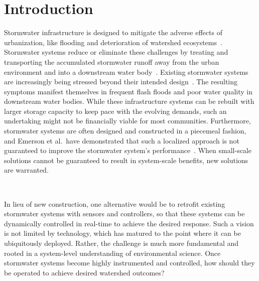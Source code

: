 \chapter{Introduction}\label{ch:introduction}
Stormwater infrastructure is designed to mitigate the adverse effects of urbanization, like flooding and deterioration of watershed ecosystems~\cite{national2009urban, randhir2009urbanization}.
Stormwater systems reduce or eliminate these challenges by treating and transporting the accumulated stormwater runoff away from the urban environment and into a downstream water body~\cite{national2009urban}.
Existing stormwater systems are increasingly being stressed beyond their intended design~\cite{kerkez2016, national2009urban}.
The resulting symptoms manifest themselves in frequent flash floods\cite{LarisKarklisBefore-and-afterPost} and poor water quality in downstream water bodies\cite{Watson2016TheHypoxia}.
While these infrastructure systems can be rebuilt with larger storage capacity to keep pace with the evolving demands, such an undertaking might not be financially viable for most communities\cite{kerkez2016}.
Furthermore, stormwater systems are often designed and constructed in a piecemeal fashion, and Emerson et al.\ have demonstrated that such a localized approach is not guaranteed to improve the stormwater system's performance~\cite{Emerson2005Watershed-ScaleBasins}.
When small-scale solutions cannot be guaranteed to result in system-scale benefits,  new solutions are warranted.

\

In lieu of new construction, one alternative would be to retrofit existing stormwater systems with sensors and controllers, so that these systems can be dynamically controlled in real-time to achieve the desired response\cite{kerkez2016, Mullapudi_Wong_Kerkez_2017}.
Such a vision is not limited by technology, which has matured to the point where it can be ubiquitously deployed\cite{Bartos_2018}.
Rather, the challenge is much more fundamental and rooted in a system-level understanding of environmental science.
Once stormwater systems become highly instrumented and controlled, how should they be operated to achieve desired watershed outcomes?

